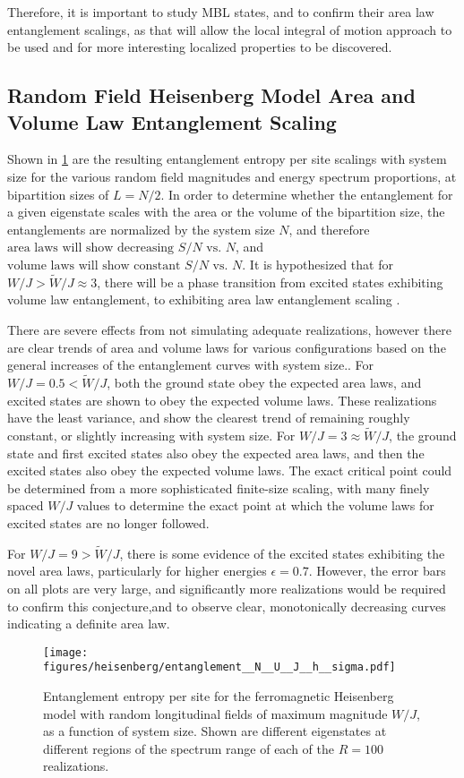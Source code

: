 \documentclass[12pt]{article}{}
\begin{document}
Therefore, it is important to study MBL states, and to confirm their area law entanglement scalings, as that will allow the local integral of motion approach to be used and for more interesting localized properties to be discovered.

\subsection{Random Field Heisenberg Model Area and Volume Law Entanglement Scaling}
Shown in \cref{fig:heisenberg_entanglement_N} are the resulting entanglement entropy per site scalings with system size for the various random field magnitudes and energy spectrum proportions, at bipartition sizes of $L = N/2$. In order to determine whether the entanglement for a given eigenstate scales with the area or the volume of the bipartition size, the entanglements are normalized by the system size $N$, and therefore $\boxed{\textrm{area laws will show decreasing } S/N \textrm{ vs. } N}$, and $\boxed{\textrm{volume laws will show constant } S/N \textrm{ vs. } N}$. It is hypothesized that for $W/J > \tilde{W}/J \approx 3$, there will be a phase transition from excited states exhibiting volume law entanglement, to exhibiting area law entanglement scaling \cite{Abanin2018}.

There are severe effects from not simulating adequate realizations, however there are clear trends of area and volume laws for various configurations based on the general increases of the entanglement curves with system size.. For $W/J = 0.5 < \tilde{W}/J$, both the ground state obey the expected area laws, and excited states are shown to obey the expected volume laws. These realizations have the least variance, and show the clearest trend of remaining roughly constant, or slightly increasing with system size. For $W/J = 3 \approx \tilde{W}/J$, the ground state and first excited states also obey the expected area laws, and then the excited states also obey the expected volume laws. The exact critical point could be determined from a more sophisticated finite-size scaling, with many finely spaced $W/J$ values to determine the exact point at which the volume laws for excited states are no longer followed.

For $W/J = 9 > \tilde{W}/J$, there is some evidence of the excited states exhibiting the novel area laws, particularly for higher energies $\epsilon = 0.7$. However, the error bars on all plots are very large, and significantly more realizations would be required to confirm this conjecture,and to observe clear, monotonically decreasing curves indicating a definite area law.
\begin{figure}[H]
  \centering
  \texttt{[image: figures/heisenberg/entanglement\_\_N\_\_U\_\_J\_\_h\_\_sigma.pdf]}
  \caption{Entanglement entropy per site for the ferromagnetic Heisenberg model with random longitudinal fields of maximum magnitude $W/J$, as a function of system size. Shown are different eigenstates at different regions of the spectrum range of each of the $R = 100$ realizations.}
  \label{fig:heisenberg_entanglement_N}
\end{figure}
\end{document}
